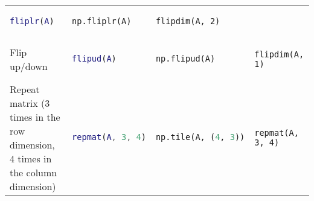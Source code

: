 \documentclass[10pt, landscape]{article}
\begin{document}
\begin{multicols}{2}
\begin{tabular}[]{@{}llll@{}}
\begin{minipage}[t]{0.23\columnwidth}
\begin{lstlisting}[language=Matlab]
fliplr(A)
\end{lstlisting}
\strut
\end{minipage} & \begin{minipage}[t]{0.20\columnwidth}\raggedright\strut
\begin{lstlisting}[language=Python]
np.fliplr(A)
\end{lstlisting}
\strut
\end{minipage} & \begin{minipage}[t]{0.20\columnwidth}\raggedright\strut
\begin{lstlisting}
flipdim(A, 2)
\end{lstlisting}
\strut
\end{minipage}\tabularnewline
\begin{minipage}[t]{0.24\columnwidth}\raggedright\strut
Flip up/down\strut
\end{minipage} & \begin{minipage}[t]{0.23\columnwidth}\raggedright\strut
\begin{lstlisting}[language=Matlab]
flipud(A)
\end{lstlisting}
\strut
\end{minipage} & \begin{minipage}[t]{0.20\columnwidth}\raggedright\strut
\begin{lstlisting}[language=Python]
np.flipud(A)
\end{lstlisting}
\strut
\end{minipage} & \begin{minipage}[t]{0.20\columnwidth}\raggedright\strut
\begin{lstlisting}
flipdim(A, 1)
\end{lstlisting}
\strut
\end{minipage}\tabularnewline
\begin{minipage}[t]{0.24\columnwidth}\raggedright\strut
Repeat matrix (3 times in the row dimension, 4 times in the column
dimension)\strut
\end{minipage} & \begin{minipage}[t]{0.23\columnwidth}\raggedright\strut
\begin{lstlisting}[language=Matlab]
repmat(A, 3, 4)
\end{lstlisting}
\strut
\end{minipage} & \begin{minipage}[t]{0.20\columnwidth}\raggedright\strut
\begin{lstlisting}[language=Python]
np.tile(A, (4, 3))
\end{lstlisting}
\strut
\end{minipage} & \begin{minipage}[t]{0.20\columnwidth}\raggedright\strut
\begin{lstlisting}
repmat(A, 3, 4)
\end{lstlisting}
\strut
\end{minipage}\tabularnewline
\bottomrule
\end{tabular}


\end{multicols}
\end{document}
